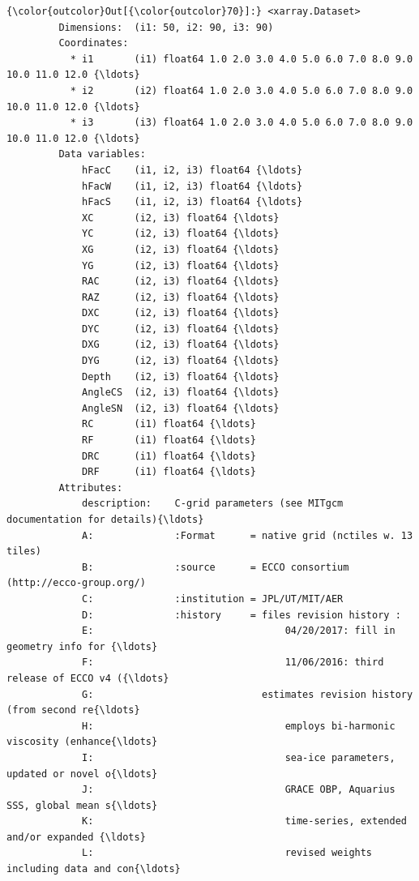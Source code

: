 \documentclass[11pt]{article}
\begin{document}
\begin{Verbatim}[commandchars=\\\{\}]
{\color{outcolor}Out[{\color{outcolor}70}]:} <xarray.Dataset>
         Dimensions:  (i1: 50, i2: 90, i3: 90)
         Coordinates:
           * i1       (i1) float64 1.0 2.0 3.0 4.0 5.0 6.0 7.0 8.0 9.0 10.0 11.0 12.0 {\ldots}
           * i2       (i2) float64 1.0 2.0 3.0 4.0 5.0 6.0 7.0 8.0 9.0 10.0 11.0 12.0 {\ldots}
           * i3       (i3) float64 1.0 2.0 3.0 4.0 5.0 6.0 7.0 8.0 9.0 10.0 11.0 12.0 {\ldots}
         Data variables:
             hFacC    (i1, i2, i3) float64 {\ldots}
             hFacW    (i1, i2, i3) float64 {\ldots}
             hFacS    (i1, i2, i3) float64 {\ldots}
             XC       (i2, i3) float64 {\ldots}
             YC       (i2, i3) float64 {\ldots}
             XG       (i2, i3) float64 {\ldots}
             YG       (i2, i3) float64 {\ldots}
             RAC      (i2, i3) float64 {\ldots}
             RAZ      (i2, i3) float64 {\ldots}
             DXC      (i2, i3) float64 {\ldots}
             DYC      (i2, i3) float64 {\ldots}
             DXG      (i2, i3) float64 {\ldots}
             DYG      (i2, i3) float64 {\ldots}
             Depth    (i2, i3) float64 {\ldots}
             AngleCS  (i2, i3) float64 {\ldots}
             AngleSN  (i2, i3) float64 {\ldots}
             RC       (i1) float64 {\ldots}
             RF       (i1) float64 {\ldots}
             DRC      (i1) float64 {\ldots}
             DRF      (i1) float64 {\ldots}
         Attributes:
             description:    C-grid parameters (see MITgcm documentation for details){\ldots}
             A:              :Format      = native grid (nctiles w. 13 tiles)
             B:              :source      = ECCO consortium (http://ecco-group.org/)
             C:              :institution = JPL/UT/MIT/AER
             D:              :history     = files revision history :
             E:                                 04/20/2017: fill in geometry info for {\ldots}
             F:                                 11/06/2016: third release of ECCO v4 ({\ldots}
             G:                             estimates revision history (from second re{\ldots}
             H:                                 employs bi-harmonic viscosity (enhance{\ldots}
             I:                                 sea-ice parameters, updated or novel o{\ldots}
             J:                                 GRACE OBP, Aquarius SSS, global mean s{\ldots}
             K:                                 time-series, extended and/or expanded {\ldots}
             L:                                 revised weights including data and con{\ldots}

\end{Verbatim}
\end{document}
